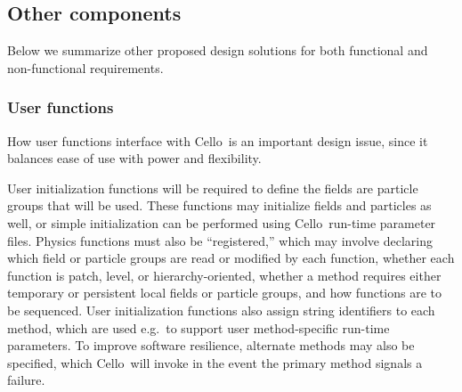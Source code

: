 \documentclass[11pt,letterpaper]{article}
\newcommand{\cello}{\textsf{Cello}}
\begin{document}

% 

\subsection{Other components} \label{ss:design-other}


Below we summarize other proposed design solutions for both functional
and non-functional requirements.

\subsubsection{User functions} \label{sss:design-user}

How user functions interface with \cello\ is an important design
issue, since it balances ease of use with power and flexibility.  

User initialization functions will be required to define the fields
are particle groups that will be used.  These functions may initialize
fields and particles as well, or simple initialization can be
performed using \cello\ run-time parameter files.  Physics functions
must also be ``registered,'' which may involve declaring which field
or particle groups are read or modified by each function, whether each
function is patch, level, or hierarchy-oriented, whether a method
requires either temporary or persistent local fields or particle
groups, and how functions are to be sequenced.  User initialization
functions also assign string identifiers to each method, which are
used e.g.~to support user method-specific run-time parameters.  To
improve software resilience, alternate methods may also be specified,
which \cello\ will invoke in the event the primary method signals a
failure.
\end{document}
